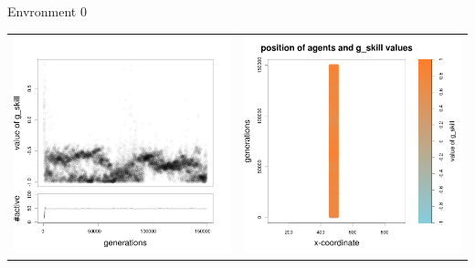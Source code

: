 \documentclass[8pt, handout=show,notes=show]{beamer}
\begin{document}
\begin{frame}{Envronment 0}
\begin{table}[H]
\centering
\begin{tabular}{cc}
 \includegraphics[width=\imgSize]{../images/5StaticEnv/Gplot62_staticEnv0}&\includegraphics[width=\imgSize]{../images/5StaticEnv/Gplot62Static_staticEnv0}\\

\end{tabular}
\end{table}
\end{frame}
\end{document}
